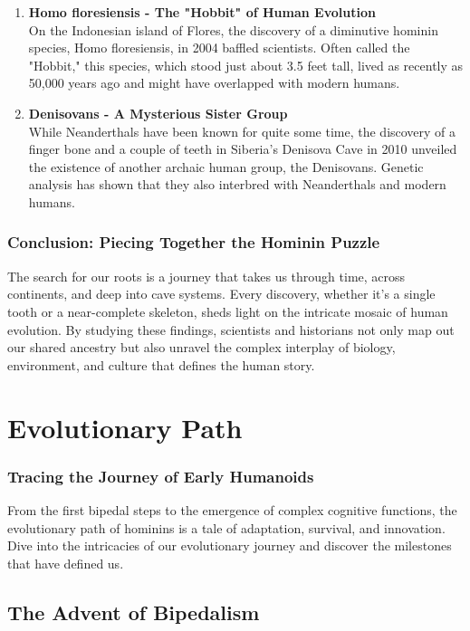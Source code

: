 \documentclass{book}
\begin{document}
\begin{enumerate}
    \item \textbf{Homo floresiensis - The "Hobbit" of Human Evolution} \\
    On the Indonesian island of Flores, the discovery of a diminutive hominin species, Homo floresiensis, in 2004 baffled scientists. Often called the "Hobbit," this species, which stood just about 3.5 feet tall, lived as recently as 50,000 years ago and might have overlapped with modern humans.

    \item \textbf{Denisovans - A Mysterious Sister Group} \\
    While Neanderthals have been known for quite some time, the discovery of a finger bone and a couple of teeth in Siberia's Denisova Cave in 2010 unveiled the existence of another archaic human group, the Denisovans. Genetic analysis has shown that they also interbred with Neanderthals and modern humans.
\end{enumerate}

\subsection*{Conclusion: Piecing Together the Hominin Puzzle}
The search for our roots is a journey that takes us through time, across continents, and deep into cave systems. Every discovery, whether it's a single tooth or a near-complete skeleton, sheds light on the intricate mosaic of human evolution. By studying these findings, scientists and historians not only map out our shared ancestry but also unravel the complex interplay of biology, environment, and culture that defines the human story.

\chapter{Evolutionary Path}
\subsection*{Tracing the Journey of Early Humanoids}

From the first bipedal steps to the emergence of complex cognitive functions, the evolutionary path of hominins is a tale of adaptation, survival, and innovation. Dive into the intricacies of our evolutionary journey and discover the milestones that have defined us.

\section*{The Advent of Bipedalism}
\end{document}
